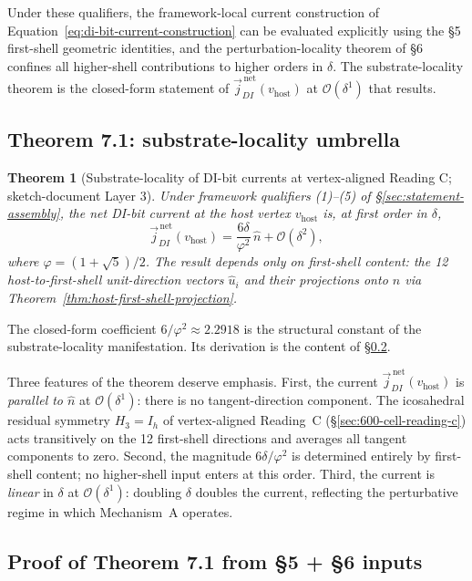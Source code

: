 \documentclass[11pt,letterpaper]{article}
\newtheorem{theorem}{Theorem}[section]
\newcommand{\phig}{\varphi}
\newcommand{\vhost}{v_{\text{host}}}
\newcommand{\jDInet}{\vec{j}_{DI}^{\,\text{net}}}
\newcommand{\bigO}[1]{\mathcal{O}(#1)}
\begin{document}
Under these qualifiers, the framework-local current construction of Equation~\eqref{eq:di-bit-current-construction} can be evaluated explicitly using the §5 first-shell geometric identities, and the perturbation-locality theorem of §6 confines all higher-shell contributions to higher orders in $\delta$. The substrate-locality theorem is the closed-form statement of $\jDInet(\vhost)$ at $\bigO{\delta^1}$ that results.

\subsection{Theorem 7.1: substrate-locality umbrella}
\label{sec:substrate-locality-theorem-body}

\begin{theorem}[Substrate-locality of DI-bit currents at vertex-aligned Reading C;
sketch-document Layer 3]
\label{thm:substrate-locality}
Under framework qualifiers (1)--(5) of \S\ref{sec:statement-assembly}, the net DI-bit current at the host vertex $\vhost$ is, at first order in $\delta$,
\begin{equation}
\jDInet(\vhost) = \frac{6 \delta}{\phig^2} \, \hat{n} + \bigO{\delta^2},
\label{eq:substrate-locality}
\end{equation}
where $\phig = (1 + \sqrt{5})/2$. The result depends only on first-shell content: the 12 host-to-first-shell unit-direction vectors $\hat{u}_i$ and their projections onto $\hat{n}$ via Theorem~\ref{thm:host-first-shell-projection}.
\end{theorem}

The closed-form coefficient $6/\phig^2 \approx 2.2918$ is the structural constant of the substrate-locality manifestation. Its derivation is the content of \S\ref{sec:proof-from-5-6}.

Three features of the theorem deserve emphasis. First, the current $\jDInet(\vhost)$ is \emph{parallel to $\hat{n}$} at $\bigO{\delta^1}$: there is no tangent-direction component. The icosahedral residual symmetry $H_3 = I_h$ of vertex-aligned Reading~C (\S\ref{sec:600-cell-reading-c}) acts transitively on the 12 first-shell directions and averages all tangent components to zero. Second, the magnitude $6\delta/\phig^2$ is determined entirely by first-shell content; no higher-shell input enters at this order. Third, the current is \emph{linear} in $\delta$ at $\bigO{\delta^1}$: doubling $\delta$ doubles the current, reflecting the perturbative regime in which Mechanism~A operates.

\subsection{Proof of Theorem 7.1 from §5 + §6 inputs}
\label{sec:proof-from-5-6}
\end{document}
